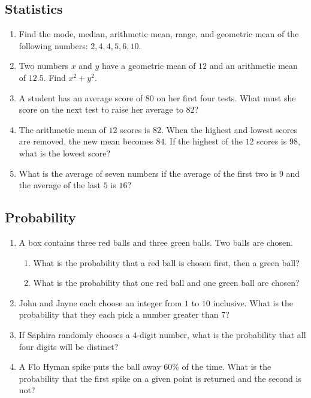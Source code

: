 \documentclass[twocolumn]{article}
\begin{document}
\subsection*{Statistics}
\begin{enumerate}
	\item Find the mode, median, arithmetic mean, range, and geometric mean
		of the following numbers: $2, 4, 4, 5, 6, 10$.
		\vspace{3cm}
	\item Two numbers $x$ and $y$ have a geometric mean of $12$ and an
		arithmetic mean of $12.5$. Find $x^2 + y^2$.
		\vspace{3cm}
	\item A student has an average score of $80$ on her first four tests.
		What must she score on the next test to raise her average to $82$?
		\vspace{3cm}
	\item The arithmetic mean of $12$ scores is $82$. When the highest and
		lowest scores are removed, the new mean becomes $84$. If the highest
		of the $12$ scores is $98$, what is the lowest score?
		\vspace{3cm}
	\item What is the average of seven numbers if the average of the first
		two is $9$ and the average of the last $5$ is $16$?
		\vspace{3cm}
\end{enumerate}

\subsection*{Probability}
\begin{enumerate}[resume]
	\item A box contains three red balls and three green balls. Two balls
		are chosen.
		\begin{enumerate}
			\item What is the probability that a red ball is chosen first,
				then a green ball?
				\vspace{3cm}
			\item What is the probability that one red ball and one green
				ball are chosen?
				\vspace{3cm}
		\end{enumerate}
	\item John and Jayne each choose an integer from $1$ to $10$ inclusive.
		What is the probability that they each pick a number greater than
		$7$?
		\vspace{3cm}
	\item If Saphira randomly chooses a $4$-digit number, what is the
		probability that all four digits will be distinct?
		\vspace{3cm}
	\item A Flo Hyman spike puts the ball away $60\%$ of the time. What is
		the probability that the first spike on a given point is returned
		and the second is not?
		\vspace{3cm}
\end{enumerate}
\end{document}
